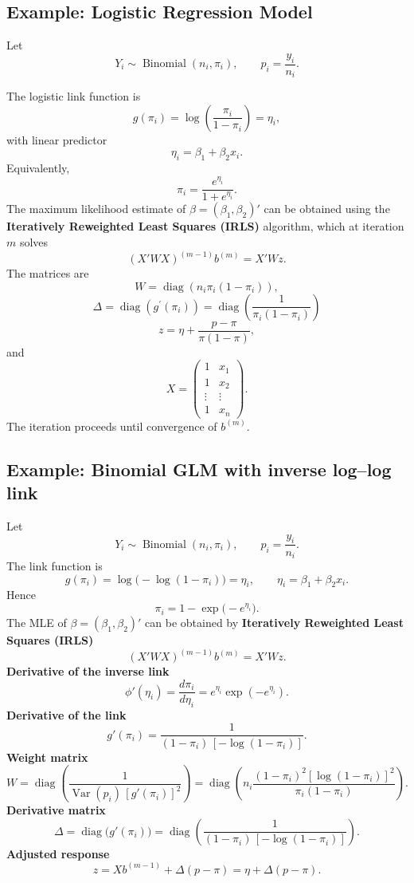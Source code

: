 \documentclass[11pt]{article}
\theoremstyle{definition}
\begin{document}
\subsection*{Example: Logistic Regression Model}
Let
\[
Y_i \sim \operatorname{Binomial}(n_i,\pi_i), 
\qquad 
p_i=\frac{y_i}{n_i}.
\]

The logistic link function is
\[
g(\pi_i)=\log\!\left(\frac{\pi_i}{1-\pi_i}\right)=\eta_i,
\]
with linear predictor
\[
\eta_i=\beta_1+\beta_2 x_i .
\]
Equivalently,
\[
\pi_i=\frac{e^{\eta_i}}{1+e^{\eta_i}}.
\]
The maximum likelihood estimate of $\beta=(\beta_1,\beta_2)'$
can be obtained using the \textbf{Iteratively Reweighted Least Squares (IRLS)} algorithm,
which at iteration $m$ solves
\[
(X'WX)^{(m-1)} b^{(m)} = X'Wz .
\]
The matrices are
\[
W=\operatorname{diag}\!\left(n_i\pi_i(1-\pi_i)\right),
\]
\[
\Delta=\operatorname{diag}(g^\prime(\pi_i)) = \operatorname{diag}(\frac{1}{\pi_i(1-\pi_i)})
\]
\[
z=\eta+\frac{p-\pi}{\pi(1-\pi)},
\]
and
\[
X=
\begin{pmatrix}
1 & x_1\\
1 & x_2\\
\vdots & \vdots\\
1 & x_n
\end{pmatrix}.
\]
The iteration proceeds until convergence of $b^{(m)}$.

\subsection*{Example: Binomial GLM with inverse log–log link}
Let
\[
Y_i \sim \operatorname{Binomial}(n_i,\pi_i), 
\qquad 
p_i=\frac{y_i}{n_i}.
\]
The link function is
\[
g(\pi_i)=\log\!\big(-\log(1-\pi_i)\big)=\eta_i,
\qquad
\eta_i=\beta_1+\beta_2 x_i .
\]
Hence
\[
\pi_i
=
1-\exp\!\big(-e^{\eta_i}\big).
\]
The MLE of $\beta=(\beta_1,\beta_2)'$ can be obtained by
\textbf{Iteratively Reweighted Least Squares (IRLS)}
\[
(X'WX)^{(m-1)} b^{(m)} = X'Wz .
\]
\textbf{Derivative of the inverse link}
\[
\phi'(\eta_i)
=
\frac{d\pi_i}{d\eta_i}
=
e^{\eta_i}\exp(-e^{\eta_i}).
\]
\textbf{Derivative of the link}
\[
g'(\pi_i)
=
\frac{1}{(1-\pi_i)\,[-\log(1-\pi_i)]}.
\]
\textbf{Weight matrix}
\[
W
=
\operatorname{diag}\!\left(
\frac{1}{\operatorname{Var}(p_i)\,[g'(\pi_i)]^2}
\right)
=
\operatorname{diag}\!\left(
n_i
\frac{(1-\pi_i)^2[\log(1-\pi_i)]^2}{\pi_i(1-\pi_i)}
\right).
\]
\textbf{Derivative matrix}
\[
\Delta
=
\operatorname{diag}\!\big(g'(\pi_i)\big)
=
\operatorname{diag}\!\left(
\frac{1}{(1-\pi_i)\,[-\log(1-\pi_i)]}
\right).
\]
\textbf{Adjusted response}
\[
z
=
X b^{(m-1)} + \Delta(p-\pi)
=
\eta + \Delta(p-\pi).
\]
\end{document}
